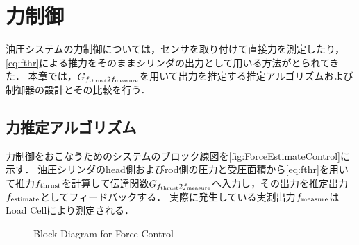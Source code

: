 \chapter{力制御}
油圧システムの力制御については，センサを取り付けて直接力を測定したり，\eqnname\ref{eq:fthr}による推力をそのままシリンダの出力として用いる方法がとられてきた\cite{semini2010design,semini2010hyq,川端健太郎20141a1,岡田大貴2017多自由度油圧駆動ロボットのシリンダ圧に基づく手先負荷力推定による力覚フィードバック}．
本章では，$G_{f_\mathrm{thrust}2f_\mathrm{measure}}$を用いて出力を推定する推定アルゴリズムおよび制御器の設計とその比較を行う．

\section{力推定アルゴリズム}
力制御をおこなうためのシステムのブロック線図を\figname\ref{fig:ForceEstimateControl}に示す．
油圧シリンダのhead側およびrod側の圧力と受圧面積から\eqnname\ref{eq:fthr}を用いて推力$f_\mathrm{thrust}$を計算して伝達関数$G_{f_\mathrm{thrust}2f_\mathrm{measure}}$へ入力し，その出力を推定出力$f_\mathrm{estimate}$としてフィードバックする．
実際に発生している実測出力$f_\mathrm{measure}$はLoad Cellにより測定される．

\begin{figure}[t]
    \centering
        
        \caption{Block Diagram for Force Control}
        \label{fig4:ForceEstimateControl}
\end{figure}


